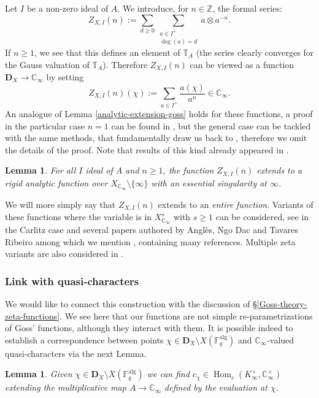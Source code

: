 \documentclass[11pt]{amsart}
\numberwithin{equation}{section}
\newcommand{\ZZ}{\mathbb{Z}}
\newcommand{\FF}{\mathbb{F}}
\newcommand{\CC}{\mathbb{C}}
\newcommand{\TT}{\mathbb{T}}
\newtheorem{Lemma}[Theorem]{Lemma}
\begin{document}
Let $I$ be a non-zero ideal of $A$. We introduce, for $n\in\ZZ$, the formal series:
$$Z_{X,I}(n):=\sum_{d\geq 0}\sum_{\begin{smallmatrix}a\in I^+\\ \deg(a)=d\end{smallmatrix}}a\otimes a^{-n}.$$
If $n\geq 1$, we see that this defines an element of $\TT_A$ (the series clearly converges for the Gauss valuation of $\TT_A$). Therefore $Z_{X,I}(n)$ can be viewed as a function $\boldsymbol{D}_X\rightarrow\CC_\infty$ by setting
$$Z_{X,I}(n)(\chi):=\sum_{a\in I^+}\frac{a(\chi)}{a^n}\in\CC_\infty.$$ An analogue of Lemma \ref{analytic-extension-goss} holds for these functions, a proof in the particular case $n=1$ can be found in \cite[Lemma 1.1]{CHU&NGO&PEL}, but the general case can be tackled with the same methods, that fundamentally draw us back to \cite[Lemma 8.8.1]{GOS}, therefore we omit the details of the proof. Note that results of this kind already appeared in \cite{ANG&PEL}.

\begin{Lemma}\label{partial-zeta-are-entire}
For all $I$ ideal of $A$ and $n\geq 1$, the function $Z_{X,I}(n)$ extends to a rigid analytic function over $X_{\CC_\infty}\setminus\{\infty\}$ with an essential singularity at $\infty$.
\end{Lemma}

We will more simply say that $Z_{X,I}(n)$ extends to an {\em entire function}.
Variants of these functions where the variable is in $X_{\CC_\infty}^s$ with $s\geq 1$ can be considered, see \cite{ANG&PEL} in the Carlitz case and several papers authored by Angl\`es, Ngo Dac and Tavares Ribeiro among which we mention \cite{ANG&NGO&TAV}, containing many references. Multiple zeta variants are also considered in \cite{CHU&NGO&PEL}.

\subsubsection{Link with quasi-characters}

We would like to connect this construction with the discussion of \S \ref{Goss-theory-zeta-functions}. 
We see here that our functions are not simple re-parametrizations of Goss' functions, although they interact with them.
It is possible indeed to establish a correspondence between points $\chi\in\boldsymbol{D}_X\setminus X(\FF_q^{\text{alg}})$ and $\CC_\infty$-valued quasi-characters via the next Lemma.

\begin{Lemma}
Given $\chi\in\boldsymbol{D}_X\setminus X(\FF_q^{\text{alg}})$ we can find $c_\chi\in\operatorname{Hom}_c(K_\infty^\times,\CC_\infty^\times)$ extending the multiplicative map $A\rightarrow\CC_\infty$ defined by the evaluation at $\chi$.
\end{Lemma}
\end{document}
